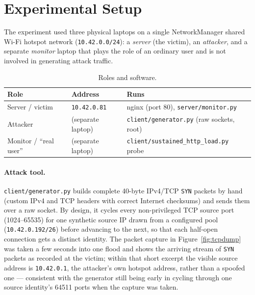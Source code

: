 \documentclass[11pt,a4paper]{article}
\begin{document}
\section{Experimental Setup}
The experiment used three physical laptops on a single NetworkManager shared
Wi-Fi hotspot network (\texttt{10.42.0.0/24}): a \emph{server} (the victim), an
\emph{attacker}, and a separate \emph{monitor} laptop that plays the role of an
ordinary user and is not involved in generating attack traffic.

\begin{table}[H]
\centering
\caption{Roles and software.}
\begin{tabular}{@{}lll@{}}
\toprule
\textbf{Role} & \textbf{Address} & \textbf{Runs} \\ \midrule
Server / victim & \texttt{10.42.0.81} & nginx (port 80), \texttt{server/monitor.py} \\
Attacker & (separate laptop) & \texttt{client/generator.py} (raw sockets, root) \\
Monitor / ``real user'' & (separate laptop) & \texttt{client/sustained\_http\_load.py} probe \\ \bottomrule
\end{tabular}
\end{table}

\paragraph{Attack tool.} \texttt{client/generator.py} builds complete 40-byte
IPv4/TCP \texttt{SYN} packets by hand (custom IPv4 and TCP headers with correct
Internet checksums) and sends them over a raw socket. By design, it cycles
every non-privileged TCP source port (1024--65535) for one synthetic source IP
drawn from a configured pool (\texttt{10.42.0.192/26}) before advancing to the
next, so that each half-open connection gets a distinct identity. The packet
capture in Figure~\ref{fig:tcpdump} was taken a few seconds into one flood and
shows the arriving stream of \texttt{SYN} packets as recorded at the victim;
within that short excerpt the visible source address is \texttt{10.42.0.1},
the attacker's own hotspot address, rather than a spoofed one --- consistent
with the generator still being early in cycling through one source identity's
64511 ports when the capture was taken.
\end{document}
